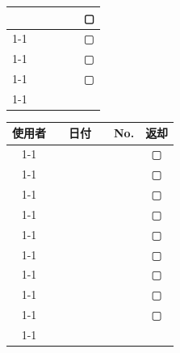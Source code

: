 \documentclass[paper=a4, fontsize=10bp]{jlreq}
\begin{document}
\begin{table}[H]
\begin{minipage}[h]{0.5\linewidth}
\begin{tabular}{cccccc}
            \multicolumn{1}{|c|}{} & & \multicolumn{1}{|c|}{} & & \multicolumn{1}{|c|}{} & ▢  \\ \cline{1-1} \cline{3-3} \cline{5-5}
            \multicolumn{1}{|c|}{} & & \multicolumn{1}{|c|}{} & & \multicolumn{1}{|c|}{} & ▢  \\ \cline{1-1} \cline{3-3} \cline{5-5}
            \multicolumn{1}{|c|}{} & & \multicolumn{1}{|c|}{} & & \multicolumn{1}{|c|}{} & ▢  \\ \cline{1-1} \cline{3-3} \cline{5-5}
            \multicolumn{1}{|c|}{} & & \multicolumn{1}{|c|}{} & & \multicolumn{1}{|c|}{} & ▢  \\ \cline{1-1} \cline{3-3} \cline{5-5}
        \end{tabular}
    \end{minipage}
    \begin{minipage}[h]{0.4\linewidth}
        \centering
        \begin{tabular}{cccccc}
            \hspace{20bp}使用者\hspace{20bp} & & 日付 & & No. & 返却 \\ \cline{1-1} \cline{3-3} \cline{5-5}
            \multicolumn{1}{|c|}{} & & \multicolumn{1}{|c|}{} & & \multicolumn{1}{|c|}{} & ▢  \\ \cline{1-1} \cline{3-3} \cline{5-5}
            \multicolumn{1}{|c|}{} & & \multicolumn{1}{|c|}{} & & \multicolumn{1}{|c|}{} & ▢  \\ \cline{1-1} \cline{3-3} \cline{5-5}
            \multicolumn{1}{|c|}{} & & \multicolumn{1}{|c|}{} & & \multicolumn{1}{|c|}{} & ▢  \\ \cline{1-1} \cline{3-3} \cline{5-5}
            \multicolumn{1}{|c|}{} & & \multicolumn{1}{|c|}{} & & \multicolumn{1}{|c|}{} & ▢  \\ \cline{1-1} \cline{3-3} \cline{5-5}
            \multicolumn{1}{|c|}{} & & \multicolumn{1}{|c|}{} & & \multicolumn{1}{|c|}{} & ▢  \\ \cline{1-1} \cline{3-3} \cline{5-5}
            \multicolumn{1}{|c|}{} & & \multicolumn{1}{|c|}{} & & \multicolumn{1}{|c|}{} & ▢  \\ \cline{1-1} \cline{3-3} \cline{5-5}
            \multicolumn{1}{|c|}{} & & \multicolumn{1}{|c|}{} & & \multicolumn{1}{|c|}{} & ▢  \\ \cline{1-1} \cline{3-3} \cline{5-5}
            \multicolumn{1}{|c|}{} & & \multicolumn{1}{|c|}{} & & \multicolumn{1}{|c|}{} & ▢  \\ \cline{1-1} \cline{3-3} \cline{5-5}
            \multicolumn{1}{|c|}{} & & \multicolumn{1}{|c|}{} & & \multicolumn{1}{|c|}{} & ▢  \\ \cline{1-1} \cline{3-3} \cline{5-5}

\end{tabular}
\end{minipage}
\end{table}
\end{document}
